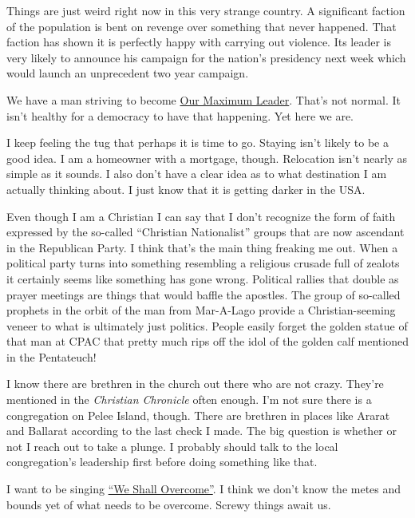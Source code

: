 Things are just weird right now in this very strange country. A
significant faction of the population is bent on revenge over something
that never happened. That faction has shown it is perfectly happy with
carrying out violence. Its leader is very likely to announce his
campaign for the nation's presidency next week which would launch an
unprecedent two year campaign.

We have a man striving to become
\href{https://en.wikipedia.org/w/index.php?title=Maximum_Leader&oldid=1113472252}{Our
Maximum Leader}. That's not normal. It isn't healthy for a democracy to
have that happening. Yet here we are.

I keep feeling the tug that perhaps it is time to go. Staying isn't
likely to be a good idea. I am a homeowner with a mortgage, though.
Relocation isn't nearly as simple as it sounds. I also don't have a
clear idea as to what destination I am actually thinking about. I just
know that it is getting darker in the USA.

Even though I am a Christian I can say that I don't recognize the form
of faith expressed by the so-called ``Christian Nationalist'' groups
that are now ascendant in the Republican Party. I think that's the main
thing freaking me out. When a political party turns into something
resembling a religious crusade full of zealots it certainly seems like
something has gone wrong. Political rallies that double as prayer
meetings are things that would baffle the apostles. The group of
so-called prophets in the orbit of the man from Mar-A-Lago provide a
Christian-seeming veneer to what is ultimately just politics. People
easily forget the golden statue of that man at CPAC that pretty much
rips off the idol of the golden calf mentioned in the Pentateuch!

I know there are brethren in the church out there who are not crazy.
They're mentioned in the \emph{Christian Chronicle} often enough. I'm
not sure there is a congregation on Pelee Island, though. There are
brethren in places like Ararat and Ballarat according to the last check
I made. The big question is whether or not I reach out to take a plunge.
I probably should talk to the local congregation's leadership first
before doing something like that.

I want to be singing
\href{https://www.npr.org/2006/04/26/5362968/springsteen-speaks-the-music-of-pete-seeger}{``We
Shall Overcome''}. I think we don't know the metes and bounds yet of
what needs to be overcome. Screwy things await us.
